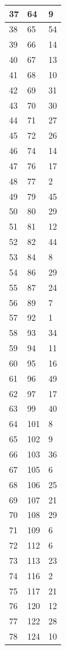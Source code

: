 \begin{tabular}{p{}p{}p{}}
\hline
37 & 64 & 9 \\
\hline
38 & 65 & 54 \\
\hline
39 & 66 & 14 \\
\hline
40 & 67 & 13 \\
\hline
41 & 68 & 10 \\
\hline
42 & 69 & 31 \\
\hline
43 & 70 & 30 \\
\hline
44 & 71 & 27 \\
\hline
45 & 72 & 26 \\
\hline
46 & 74 & 14 \\
\hline
47 & 76 & 17 \\
\hline
48 & 77 & 2 \\
\hline
49 & 79 & 45 \\
\hline
50 & 80 & 29 \\
\hline
51 & 81 & 12 \\
\hline
52 & 82 & 44 \\
\hline
53 & 84 & 8 \\
\hline
54 & 86 & 29 \\
\hline
55 & 87 & 24 \\
\hline
56 & 89 & 7 \\
\hline
57 & 92 & 1 \\
\hline
58 & 93 & 34 \\
\hline
59 & 94 & 11 \\
\hline
60 & 95 & 16 \\
\hline
61 & 96 & 49 \\
\hline
62 & 97 & 17 \\
\hline
63 & 99 & 40 \\
\hline
64 & 101 & 8 \\
\hline
65 & 102 & 9 \\
\hline
66 & 103 & 36 \\
\hline
67 & 105 & 6 \\
\hline
68 & 106 & 25 \\
\hline
69 & 107 & 21 \\
\hline
70 & 108 & 29 \\
\hline
71 & 109 & 6 \\
\hline
72 & 112 & 6 \\
\hline
73 & 113 & 23 \\
\hline
74 & 116 & 2 \\
\hline
75 & 117 & 21 \\
\hline
76 & 120 & 12 \\
\hline
77 & 122 & 28 \\
\hline
78 & 124 & 10 \\

\end{tabular}
